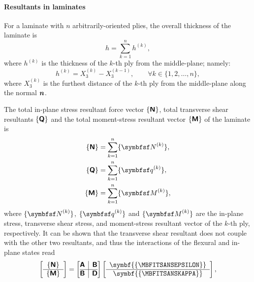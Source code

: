 \paragraph{Resultants in laminates} For a laminate with $n$ arbitrarily-oriented plies, the overall thickness of the laminate is
\begin{equation}
	h=\sum_{k=1}^{n} h^{(k)},
\end{equation}
where $h^{(k)}$ is the thickness of the $k$-th ply from the middle-plane; namely:
\begin{equation}
	h^{(k)}=X_3^{(k)}-X_3^{(k-1)},\qquad\forall k\in\{1,2,\ldots,n\},
\end{equation}
where $X_3^{(k)}$ is the furthest distance of the $k$-th ply from the middle-plane along the normal $\tena{n}$.

The total in-plane stress resultant force vector $\col{N}$, total transverse shear resultants $\col{q}$ and the total moment-stress resultant vector $\col{M}$ of the laminate is
\begin{subequations}
\begin{align}
	\col{N}&= \sum_{k=1}^{n} \{{\symbfsf N}^{(k)}\},\\
	\col{q}&= \sum_{k=1}^{n} \{{\symbfsf q}^{(k)}\},\\
	\col{M}&= \sum_{k=1}^{n} \{{\symbfsf M}^{(k)}\},
\end{align}
\end{subequations}
	where $\{{\symbfsf N}^{(k)}\}$, $\{{\symbfsf q}^{(k)}\}$ and $\{{\symbfsf M}^{(k)}\}$ are the in-plane stress, transverse shear stress, and moment-stress resultant vector of the $k$-th ply, respectively. It can be shown that the transverse shear resultant does not couple with the other two resultants, and thus the interactions of the flexural and in-plane states read
\begin{equation}
	\left[
	\begin{array}{c}
		\col{N}\\\hline
		\col{M}
	\end{array}
	\right]
	=
	\left[
		\begin{array}{@{}c|c@{}}
			\mat{A}& \mat{B}\\\hline
			\mat{B}& \mat{D}\\
		\end{array}
	\right]
	\left[
	\begin{array}{c}
		\symbf{\col{\mbfitsansepsilon}}\\\hline
		\symbf{\col{\mbfitsanskappa}}
	\end{array}
	\right],
\end{equation}	
